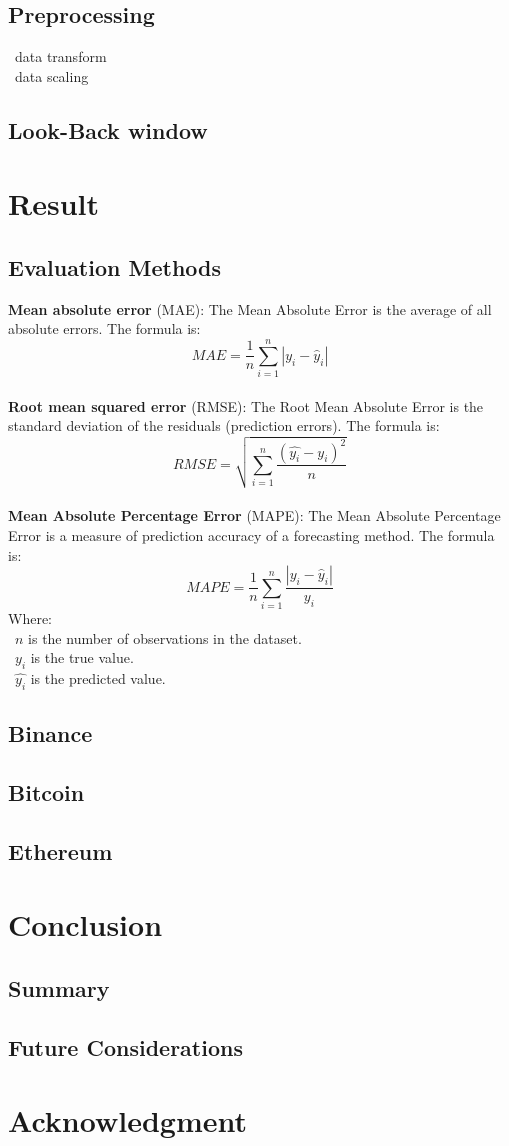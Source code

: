 \documentclass{ieeeojies}
\begin{document}
 \subsection{Preprocessing}
 \textbullet\ data transform \\
 \textbullet\ data scaling
 \subsection{Look-Back window}
\section{Result}

\subsection{Evaluation Methods}
\textbf{Mean absolute error} (MAE): 
The Mean Absolute Error is the average of all absolute errors. The formula is:\\
\[MAE = \frac{1}{n} \sum_{i=1}^{n} | y_i - \hat{y}_i |\]\\
  
\textbf{Root mean squared error} (RMSE): The Root Mean Absolute Error is the standard deviation of the residuals (prediction errors). The formula is: \\
\[RMSE=\sqrt{\sum_{i=1}^{n} \frac{(\hat{y_i}-y_i )^2}{n} }\]\\
\textbf{Mean Absolute Percentage Error} (MAPE): The Mean Absolute Percentage Error is a measure of prediction accuracy of a forecasting method. The formula is:  \\
\[MAPE=\frac{1}{n}\sum_{i=1}^{n} \frac{|y_i-\hat{y}_i|}{y_i}\]
Where: \\
	\indent\textbullet\ \(n\) is the number of observations in the dataset.\\
	\indent\textbullet\ \(y_i\)  is the true value.\\
	\indent\textbullet\ \(\hat{y_i}\) is the predicted value.
\subsection{Binance} 
\subsection{Bitcoin}
\subsection{Ethereum}
\section{Conclusion}
\subsection{Summary}

\subsection{Future Considerations}

\section*{Acknowledgment}
\nocite{*}


\EOD
\end{document}
